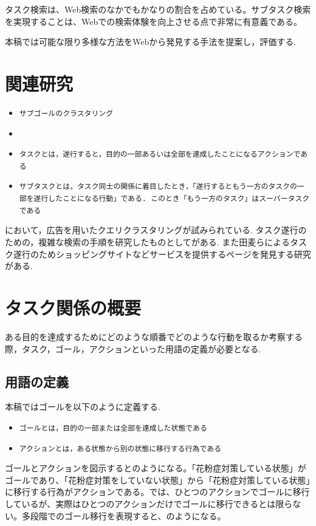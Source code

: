 \documentclass[submit,techreq]{ipsj}
\def\|{\verb|}
\begin{document}
タスク検索は、Web検索のなかでもかなりの割合を占めている。サブタスク検索を実現することは、Webでの検索体験を向上させる点で非常に有意義である。

本稿では可能な限り多様な方法をWebから発見する手法を提案し，評価する.


%2
\section{関連研究}

\begin{itemize}
\item \|サブゴールのクラスタリング|
\item \||
\item \|タスクとは，遂行すると，目的の一部あるいは全部を達成したことになるアクションである|
\item \|サブタスクとは，タスク同士の関係に着目したとき，「遂行するともう一方のタスクの一部を遂行したことになる行動」である. このとき「もう一方のタスク」はスーパータスクである|
\end{itemize}

\cite{yamatake}において，広告を用いたクエリクラスタリングが試みられている. タスク遂行のための，複雑な検索の手順を研究したものとして\cite{hassan}がある. また田麦らによるタスク遂行のためショッピングサイトなどサービスを提供するページを発見する研究\cite{tamugi}がある.

\section{タスク関係の概要}
ある目的を達成するためにどのような順番でどのような行動を取るか考察する際，タスク，ゴール，アクションといった用語の定義が必要となる.


\subsection{用語の定義}

本稿ではゴールを以下のように定義する.

\begin{itemize}
\item \|ゴールとは，目的の一部または全部を達成した状態である|
\item \|アクションとは，ある状態から別の状態に移行する行為である|
\end{itemize}

ゴールとアクションを図示するとのようになる。「花粉症対策している状態」がゴールであり、「花粉症対策をしていない状態」から「花粉症対策している状態」に移行する行為がアクションである。では、ひとつのアクションでゴールに移行しているが、実際はひとつのアクションだけでゴールに移行できるとは限らない。多段階でのゴール移行を表現すると、のようになる。
\end{document}
